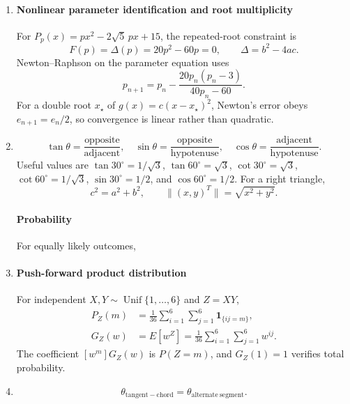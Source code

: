 \renewcommand{\theenumi}{\thesubsection.\arabic{enumi}}
\renewcommand{\labelenumi}{\textbf{\theenumi}}
\begin{enumerate}[leftmargin=0pt,itemsep=6pt]
\item
\paragraph*{Nonlinear parameter identification and root multiplicity}
For $P_p(x)=px^2-2\sqrt5\,px+15$, the repeated-root constraint is
\begin{equation}
F(p)=\Delta(p)=20p^2-60p=0,\qquad
\Delta=b^2-4ac.
\label{eq:quad-general}
\end{equation}
Newton--Raphson on the parameter equation uses
\begin{equation}
p_{n+1}=p_n-\frac{20p_n(p_n-3)}{40p_n-60}.
\label{eq:newton-multiplicity-01}
\end{equation}
For a double root $x_\star$ of $g(x)=c(x-x_\star)^2$, Newton's error obeys
$e_{n+1}=e_n/2$, so convergence is linear rather than quadratic.
\item
\begin{equation}
\tan\theta=\frac{\text{opposite}}{\text{adjacent}},\quad
\sin\theta=\frac{\text{opposite}}{\text{hypotenuse}},\quad
\cos\theta=\frac{\text{adjacent}}{\text{hypotenuse}}.
\label{eq:trig-ratios}
\end{equation}
Useful values are $\tan30^\circ=1/\sqrt3$, $\tan60^\circ=\sqrt3$, $\cot30^\circ=\sqrt3$, $\cot60^\circ=1/\sqrt3$, $\sin30^\circ=1/2$, and $\cos60^\circ=1/2$. For a right triangle,
\[c^2=a^2+b^2,\qquad \|(x,y)^T\|=\sqrt{x^2+y^2}.\]

\paragraph*{Probability}
For equally likely outcomes,

\item
\paragraph*{Push-forward product distribution}
For independent $X,Y\sim\operatorname{Unif}\{1,\ldots,6\}$ and $Z=XY$,
\begin{align}
P_Z(m)&=\frac1{36}\sum_{i=1}^{6}\sum_{j=1}^{6}\mathbf1_{\{ij=m\}},\\
G_Z(w)&=E[w^Z]=\frac1{36}\sum_{i=1}^{6}\sum_{j=1}^{6}w^{ij}.
\label{eq:product-pgf}
\end{align}
The coefficient $[w^m]G_Z(w)$ is $P(Z=m)$, and $G_Z(1)=1$ verifies total probability.
\item
\begin{equation}
\theta_{\mathrm{tangent-chord}}=\theta_{\mathrm{alternate\ segment}}.\label{eq:tangent-chord}
\end{equation}


\end{enumerate}
